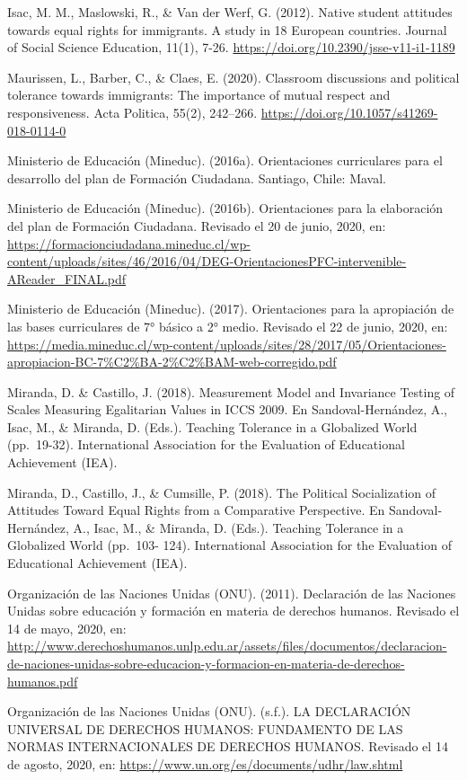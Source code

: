 \documentclass[12pt,twoside]{templates/facsothesis}
\begin{document}
Isac, M. M., Maslowski, R., \& Van der Werf, G. (2012). Native student attitudes towards equal rights for immigrants. A study in 18 European countries. Journal of Social Science Education, 11(1), 7-26. \url{https://doi.org/10.2390/jsse-v11-i1-1189}

Maurissen, L., Barber, C., \& Claes, E. (2020). Classroom discussions and political tolerance towards immigrants: The importance of mutual respect and responsiveness. Acta Politica, 55(2), 242--266. \url{https://doi.org/10.1057/s41269-018-0114-0}

Ministerio de Educación (Mineduc). (2016a). Orientaciones curriculares para el desarrollo del plan de Formación Ciudadana. Santiago, Chile: Maval.

Ministerio de Educación (Mineduc). (2016b). Orientaciones para la elaboración del plan de Formación Ciudadana. Revisado el 20 de junio, 2020, en: \url{https://formacionciudadana.mineduc.cl/wp-content/uploads/sites/46/2016/04/DEG-OrientacionesPFC-intervenible-AReader_FINAL.pdf}

Ministerio de Educación (Mineduc). (2017). Orientaciones para la apropiación de las bases curriculares de 7° básico a 2° medio. Revisado el 22 de junio, 2020, en: \url{https://media.mineduc.cl/wp-content/uploads/sites/28/2017/05/Orientaciones-apropiacion-BC-7\%C2\%BA-2\%C2\%BAM-web-corregido.pdf}

Miranda, D. \& Castillo, J. (2018). Measurement Model and Invariance Testing of Scales Measuring Egalitarian Values in ICCS 2009. En Sandoval-Hernández, A., Isac, M., \& Miranda, D. (Eds.). Teaching Tolerance in a Globalized World (pp.~19-32). International Association for the Evaluation of Educational Achievement (IEA).

Miranda, D., Castillo, J., \& Cumsille, P. (2018). The Political Socialization of Attitudes Toward Equal Rights from a Comparative Perspective. En Sandoval-Hernández, A., Isac, M., \&
Miranda, D. (Eds.). Teaching Tolerance in a Globalized World (pp.~103- 124). International Association for the Evaluation of Educational Achievement (IEA).

Organización de las Naciones Unidas (ONU). (2011). Declaración de las Naciones Unidas sobre educación y formación en materia de derechos humanos. Revisado el 14 de mayo, 2020, en: \url{http://www.derechoshumanos.unlp.edu.ar/assets/files/documentos/declaracion-de-naciones-unidas-sobre-educacion-y-formacion-en-materia-de-derechos-humanos.pdf}

Organización de las Naciones Unidas (ONU). (s.f.). LA DECLARACIÓN UNIVERSAL DE DERECHOS HUMANOS: FUNDAMENTO DE LAS NORMAS INTERNACIONALES DE DERECHOS HUMANOS. Revisado el 14 de agosto, 2020, en: \url{https://www.un.org/es/documents/udhr/law.shtml}
\end{document}

